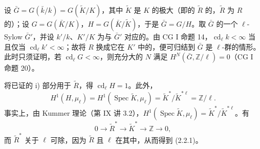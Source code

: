 设 $\bar G=G(\bar k/k)=G(\widetilde K/K)$，其中 $\widetilde K$ 是 $K$ 的极大（即的 $\widetilde R$ 的，$\widetilde R$ 为 $R$ 的）；设 $G=G(\bar K/K)$，$H=G(\bar K/\widetilde K)$，于是 $\bar G=G/H$。取 $\bar G$ 的一个 $\ell$-Sylow  $\bar G'$，并设 $k'/k$、$K'/K$ 为与 $\bar G'$ 对应的。由 CG I 命题 14，$\operatorname{cd}_\ell k<\infty$ 当且仅当 $\operatorname{cd}_\ell k'<\infty$；故将 $R$ 换成它在 $K'$ 中的，便可归结到 $\bar G$ 是 $\ell$-群的情形。此时只须证明，若 $\operatorname{cd}_\ell G<\infty$，则充分大的 $N$ 满足 $H^N(\bar G,\mathbb Z/\ell)=0$（CG I 命题 20）。

将已证的 i) 部分用于 $\widetilde R$，得 $\operatorname{cd}_\ell H=1$。此外，
\begin{equation}
 H^1(H,\mu_\ell)=H^1(\operatorname{Spec}\widetilde K,\mu_\ell)
 =\widetilde K^*/\widetilde K^{*\ell}=\mathbb Z/\ell.\tag{2.2.2}
\end{equation}
事实上，由 Kummer 理论（第 IX 讲 3.2），$H^1(\operatorname{Spec}\widetilde K,\mu_\ell)=\widetilde K^*/\widetilde K^{*\ell}$。有
\[
 0\longrightarrow\widetilde R^*\longrightarrow\widetilde K^*\longrightarrow\mathbb Z\longrightarrow0,
\]
而 $\widetilde R^*$ 关于 $\ell$ 可除，因为 $\widetilde R$ 且 $\ell$ 在其中，从而得到 (2.2.1)。


